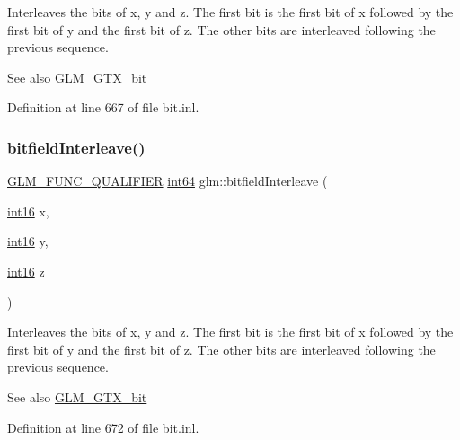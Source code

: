 Interleaves the bits of x, y and z. The first bit is the first bit of x followed by the first bit of y and the first bit of z. The other bits are interleaved following the previous sequence.

\begin{DoxySeeAlso}{See also}
\hyperlink{group__gtx__bit}{G\+L\+M\+\_\+\+G\+T\+X\+\_\+bit} 
\end{DoxySeeAlso}


Definition at line 667 of file bit.\+inl.

\mbox{\label{group__gtx__bit_gaf898f842ac089fcc8d6201c32702584a}} 
\subsubsection{\texorpdfstring{bitfield\+Interleave()}{bitfieldInterleave()}\hspace{0.1cm}{\footnotesize\ttfamily [9/16]}}
{\footnotesize\ttfamily \hyperlink{setup_8hpp_a33fdea6f91c5f834105f7415e2a64407}{G\+L\+M\+\_\+\+F\+U\+N\+C\+\_\+\+Q\+U\+A\+L\+I\+F\+I\+ER} \hyperlink{group__gtc__type__precision_ga435d75819cce297cc5fa21bd84ef89a5}{int64} glm\+::bitfield\+Interleave (\begin{DoxyParamCaption}\item[{\hyperlink{group__gtc__type__precision_ga2945a61d12771f8954994fcddf02b021}{int16}}]{x,  }\item[{\hyperlink{group__gtc__type__precision_ga2945a61d12771f8954994fcddf02b021}{int16}}]{y,  }\item[{\hyperlink{group__gtc__type__precision_ga2945a61d12771f8954994fcddf02b021}{int16}}]{z }\end{DoxyParamCaption})}

Interleaves the bits of x, y and z. The first bit is the first bit of x followed by the first bit of y and the first bit of z. The other bits are interleaved following the previous sequence.

\begin{DoxySeeAlso}{See also}
\hyperlink{group__gtx__bit}{G\+L\+M\+\_\+\+G\+T\+X\+\_\+bit} 
\end{DoxySeeAlso}


Definition at line 672 of file bit.\+inl.

